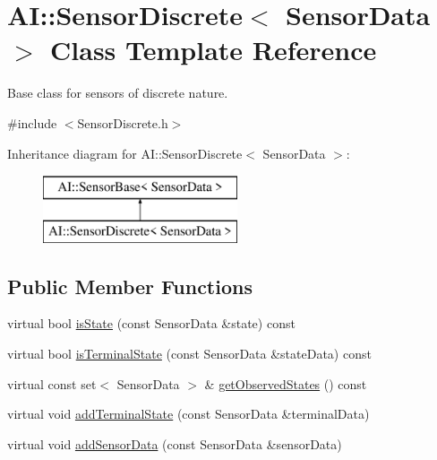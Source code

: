 \hypertarget{classAI_1_1SensorDiscrete}{\section{A\+I\+:\+:Sensor\+Discrete$<$ Sensor\+Data $>$ Class Template Reference}
\label{classAI_1_1SensorDiscrete}
}


Base class for sensors of discrete nature.  




{\ttfamily \#include $<$Sensor\+Discrete.\+h$>$}

Inheritance diagram for A\+I\+:\+:Sensor\+Discrete$<$ Sensor\+Data $>$\+:\begin{figure}[H]
\begin{center}
\leavevmode
\includegraphics[height=2.000000cm]{classAI_1_1SensorDiscrete}
\end{center}
\end{figure}
\subsection*{Public Member Functions}
\begin{DoxyCompactItemize}
\item 
virtual bool \hyperlink{classAI_1_1SensorDiscrete_a267487b20eebad42f7fcb7ee5119ac21}{is\+State} (const Sensor\+Data \&state) const 
\item 
virtual bool \hyperlink{classAI_1_1SensorDiscrete_a1d97411a1eff0ecb1a2ee054f06bfc2c}{is\+Terminal\+State} (const Sensor\+Data \&state\+Data) const 
\item 
virtual const set$<$ Sensor\+Data $>$ \& \hyperlink{classAI_1_1SensorDiscrete_ab91abf49a2e0ad5592c6c0e7ac67eb5b}{get\+Observed\+States} () const 
\item 
virtual void \hyperlink{classAI_1_1SensorDiscrete_aec690a03f58beb1755b70de98df7e0a2}{add\+Terminal\+State} (const Sensor\+Data \&terminal\+Data)
\item 
virtual void \hyperlink{classAI_1_1SensorDiscrete_a9837a3640a687ea37d5f9900c3dcbcbc}{add\+Sensor\+Data} (const Sensor\+Data \&sensor\+Data)
\end{DoxyCompactItemize}


